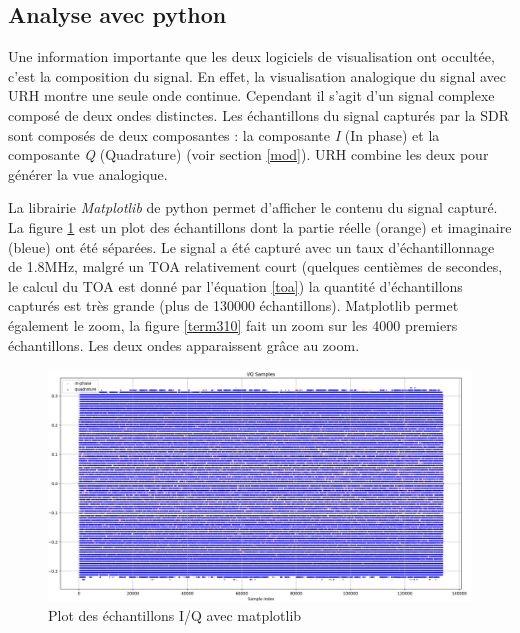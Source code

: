 \subsection{Analyse avec python}

Une information importante que les deux logiciels de visualisation ont occultée, c'est la composition du signal. En effet, la visualisation analogique du signal avec URH montre une seule onde continue. Cependant il s'agit d'un signal complexe composé de deux ondes distinctes. Les échantillons du signal capturés par la SDR sont composés de deux composantes : la composante \textit{I} (In phase) et la composante \textit{Q} (Quadrature) (voir section \ref{mod}). \ac{URH} combine les deux pour générer la vue analogique.

\vspace{0.1cm}

La librairie \textit{Matplotlib} de python permet d'afficher le contenu du signal capturé. La figure  \ref{term309} est un plot des échantillons dont la partie réelle (orange) et imaginaire (bleue) ont été séparées. Le signal a été capturé avec un taux d'échantil\-lonnage de 1.8MHz, malgré un \ac{TOA} relativement court (quelques centièmes de secondes, le calcul du \ac{TOA} est donné par l'équation \ref{toa}) la quantité d'échantillons capturés est très grande (plus de 130000 échantillons). Matplotlib permet également le zoom, la figure \ref{term310} fait un zoom sur les 4000 premiers échantillons. Les deux ondes apparaissent grâce au zoom.

\begin{figure}[h]
\centering

\includegraphics[scale=0.13]{images/iq1.png}
\caption{Plot des échantillons I/Q avec matplotlib}\label{term309}
\end{figure}



